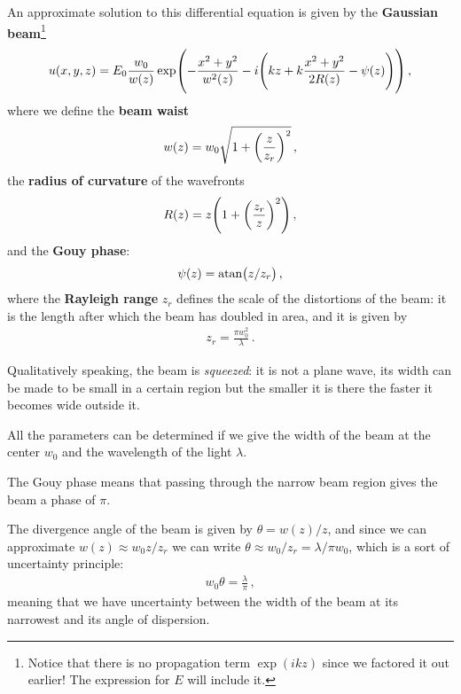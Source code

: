 \documentclass[main.tex]{subfiles}
\begin{document}
An approximate solution to this differential equation is given by the \textbf{Gaussian beam}\footnote{Notice that there is no propagation term \(\exp(i k z)\) since we factored it out earlier! The expression for \(E\) will include it.}
%
\begin{align}
u(x, y, z) = E_0 \frac{w_0 }{w(z)} \exp(-\frac{x^2 +y^2}{w^2(z)} -i \qty(kz + k\frac{x^2+y^2}{2 R(z)} - \psi (z)))
\,,
\end{align}
%
where we define the \textbf{beam waist} 
%
\begin{align}
w(z) = w_0 \sqrt{1 + \qty( \frac{z}{z_{r}})^2}
\,,
\end{align}
%
the \textbf{radius of curvature} of the wavefronts
%
\begin{align}
R(z) = z \qty(1 + \qty( \frac{z_{r}}{z})^2)
\,,
\end{align}
%
and the \textbf{Gouy phase}: 
%
\begin{align}
\psi (z) = \atan(z / z_r)
\,,
\end{align}
%
where the \textbf{Rayleigh range} \(z_r\) defines the scale of the distortions of the beam: it is the length after which the beam has doubled in area, and it is  given by 
%
\begin{align}
z_r = \frac{\pi w_0^2}{\lambda }
\,.
\end{align}

Qualitatively speaking, the beam is \emph{squeezed}: it is not a plane wave, its width can be made to be small in a certain region but the smaller it is there the faster it becomes wide outside it.

All the parameters can be determined if we give the width of the beam at the center \(w_0 \) and the wavelength of the light \(\lambda \). 


The Gouy phase means that passing through the narrow beam region gives   the beam a phase of \(\pi \). 

The divergence angle of the beam is given by \(\theta = w (z) / z \), and since we can approximate \(w(z) \approx w_0 z/z_r\) we can write \(\theta \approx w_0 / z_r = \lambda / \pi w_0 \), which is a sort of uncertainty principle: 
%
\begin{align}
w_0 \theta = \frac{\lambda}{\pi }
\,,
\end{align}
%
meaning that we have uncertainty between the width of the beam at its narrowest and its angle of dispersion.
\end{document}
